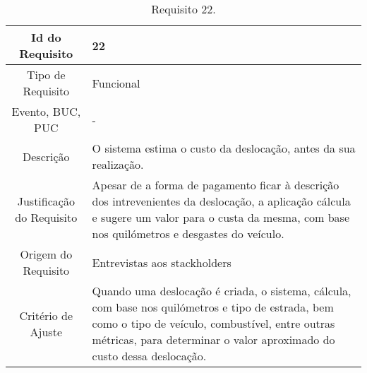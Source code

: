 \begin{table}[H]
\begin{center}
  \begin{tabularx}{\textwidth}{ | c | X | }
    \hline
    Id do Requisito & 22  \\
    
    \hline
    Tipo de Requisito & Funcional \\
    
    \hline
    Evento, BUC, PUC &  - \\
    
    \hline
    Descrição & O sistema estima o custo da deslocação, antes da sua realização.\\
    
    \hline
    Justificação do Requisito & Apesar de a forma de pagamento ficar à descrição dos intrevenientes da deslocação, a aplicação cálcula e sugere um valor para o custa da mesma, com base nos quilómetros e desgastes do veículo. \\
    
    \hline
    Origem do Requisito & Entrevistas aos stackholders\\
    
    \hline
    Critério de Ajuste & Quando uma deslocação é criada, o sistema, cálcula, com base nos quilómetros e tipo de estrada, bem como o tipo de veículo, combustível, entre outras métricas, para determinar o valor aproximado do custo dessa deslocação.   \\
    
    \hline
  \end{tabularx}
  \caption{Requisito 22.} \label{tab:r3}
\end{center}
\end{table}

